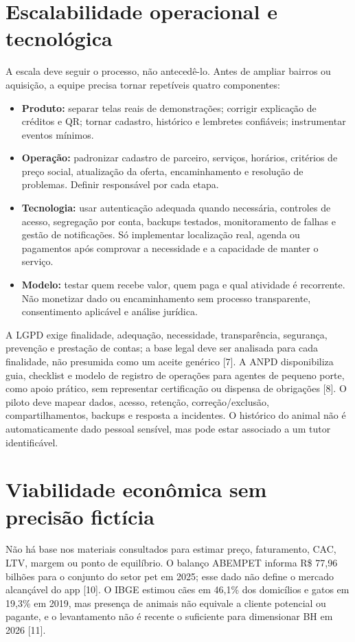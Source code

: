 \documentclass[12pt,a4paper]{article}
\begin{document}
\section{Escalabilidade operacional e tecnológica}
A escala deve seguir o processo, não antecedê-lo. Antes de ampliar bairros ou aquisição, a equipe precisa tornar repetíveis quatro componentes:
\begin{itemize}[leftmargin=*]
\item \textbf{Produto:} separar telas reais de demonstrações; corrigir explicação de créditos e QR; tornar cadastro, histórico e lembretes confiáveis; instrumentar eventos mínimos.
\item \textbf{Operação:} padronizar cadastro de parceiro, serviços, horários, critérios de preço social, atualização da oferta, encaminhamento e resolução de problemas. Definir responsável por cada etapa.
\item \textbf{Tecnologia:} usar autenticação adequada quando necessária, controles de acesso, segregação por conta, backups testados, monitoramento de falhas e gestão de notificações. Só implementar localização real, agenda ou pagamentos após comprovar a necessidade e a capacidade de manter o serviço.
\item \textbf{Modelo:} testar quem recebe valor, quem paga e qual atividade é recorrente. Não monetizar dado ou encaminhamento sem processo transparente, consentimento aplicável e análise jurídica.
\end{itemize}

A LGPD exige finalidade, adequação, necessidade, transparência, segurança, prevenção e prestação de contas; a base legal deve ser analisada para cada finalidade, não presumida como um aceite genérico [7]. A ANPD disponibiliza guia, checklist e modelo de registro de operações para agentes de pequeno porte, como apoio prático, sem representar certificação ou dispensa de obrigações [8]. O piloto deve mapear dados, acesso, retenção, correção/exclusão, compartilhamentos, backups e resposta a incidentes. O histórico do animal não é automaticamente dado pessoal sensível, mas pode estar associado a um tutor identificável.

\section{Viabilidade econômica sem precisão fictícia}
Não há base nos materiais consultados para estimar preço, faturamento, CAC, LTV, margem ou ponto de equilíbrio. O balanço ABEMPET informa R\$ 77,96 bilhões para o conjunto do setor pet em 2025; esse dado não define o mercado alcançável do app [10]. O IBGE estimou cães em 46,1\% dos domicílios e gatos em 19,3\% em 2019, mas presença de animais não equivale a cliente potencial ou pagante, e o levantamento não é recente o suficiente para dimensionar BH em 2026 [11].
\end{document}
